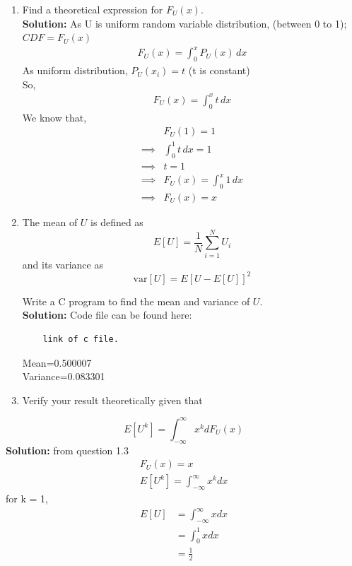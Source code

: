 \documentclass[journal,12pt,twocolumn]{IEEEtran}
\renewcommand\thesection{\arabic{section}}
\providecommand{\sbrak}[1]{\ensuremath{{}\left[#1\right]}}
\theoremstyle{remark}
\newcommand{\solution}{\noindent \textbf{Solution: }}
\numberwithin{equation}{section}
\begin{document}
\begin{enumerate}[label=\thesection.\arabic*
,ref=\thesection.\theenumi]
%
\item
Find a  theoretical expression for $F_{U}(x)$. \\
\solution
As U is uniform random variable distribution, (between 0 to 1);
$CDF = F_U(x)$
\begin{align}
	F_U(x) = \int_{0}^{x} P_U(x) \,dx 
\end{align}
As uniform distribution, $P_U(x_i) = t$ (t is constant) \\
So,
\begin{align}
	F_U(x) = \int_{0}^{x} t \,dx 
\end{align}
We know that,
\begin{align}
	&F_U(1) = 1 \\
	\implies &\int_{0}^{1} t \,dx = 1 \\
	\implies &t = 1 \\
	\implies &F_U(x) = \int_{0}^{x} 1 \,dx \\
	\implies &F_U(x) = x
\end{align}

\item
The mean of $U$ is defined as
%
\begin{equation}
E\sbrak{U} = \frac{1}{N}\sum_{i=1}^{N}U_i
\end{equation}
%
and its variance as
%
\begin{equation}
\text{var}\sbrak{U} = E\sbrak{U- E\sbrak{U}}^2 
\end{equation}

Write a C program to  find the mean and variance of $U$. \\
\solution
Code file can be found here:
\begin{lstlisting}
	link of c file.
\end{lstlisting}
Mean=0.500007 \\
Variance=0.083301
\item Verify your result theoretically given that
\end{enumerate}
%
\begin{equation}
E\sbrak{U^k} = \int_{-\infty}^{\infty}x^kdF_{U}(x)
\end{equation}
\solution
from question 1.3 \\
\begin{align}
	F_U(x) = x \\
	E\sbrak{U^k} = \int_{-\infty}^{\infty}x^kdx 
\end{align}
for k = 1,
\begin{align}
	E\sbrak{U} &= \int_{-\infty}^{\infty}xdx \\
	 &= \int_{0}^{1}xdx \\
	 &= \frac{1}{2}
\end{align}
\end{document}
